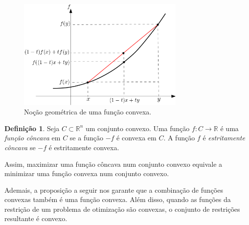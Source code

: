 \documentclass[12pt,a4paper]{scrartcl}
\def\RR{\mathds{R}}
\theoremstyle{definition}%
\newtheorem{defi}{Definição}
\begin{document}
\begin{figure}[!ht] 
	\centering
	\includegraphics[width=0.73\textwidth]{nocao_geometrica_funcao_convexa}
	\caption{Noção geométrica de uma função convexa. \label{fig:nocao_funcao_convexa}}
\end{figure}

\begin{defi}
Seja $C \subset \RR^{n}$ um conjunto convexo. Uma função $f: C \rightarrow \RR $ é uma \emph{função côncava} em $C$ se a função $-f$ é convexa em $C$. A função $f$ é \emph{estritamente côncava} se $-f$ é estritamente convexa.
\end{defi}

Assim, maximizar uma função côncava num conjunto convexo equivale a minimizar uma função convexa num conjunto convexo.

Ademais, a proposição a seguir nos garante que a combinação de funções convexas também é uma função convexa. Além disso, quando as funções da restrição de um problema de otimização são convexas, o conjunto de restrições resultante é convexo.
\end{document}
